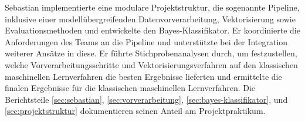 \label{sec:sebastian}
Sebastian implementierte eine modulare Projektstruktur, die sogenannte \glqq Pipeline\grqq, inklusive einer modellübergreifenden Datenvorverarbeitung, Vektorisierung sowie Evaluationsmethoden und entwickelte den Bayes-Klassifikator. Er koordinierte die Anforderungen des Teams an die Pipeline und unterstützte bei der Integration weiterer Ansätze in diese. Er führte Stichprobenanalysen durch, um festzustellen, welche Vorverarbeitungsschritte und Vektorisierungsverfahren auf den klassischen maschinellen Lernverfahren die besten Ergebnisse lieferten und ermittelte die finalen Ergebnisse für die klassischen maschinellen Lernverfahren. Die Berichtsteile \ref{sec:sebastian}, \ref{sec:vorverarbeitung}, \ref{sec:bayes-klassifikator}, und \ref{sec:projektstruktur} dokumentieren seinen Anteil am Projektpraktikum.
